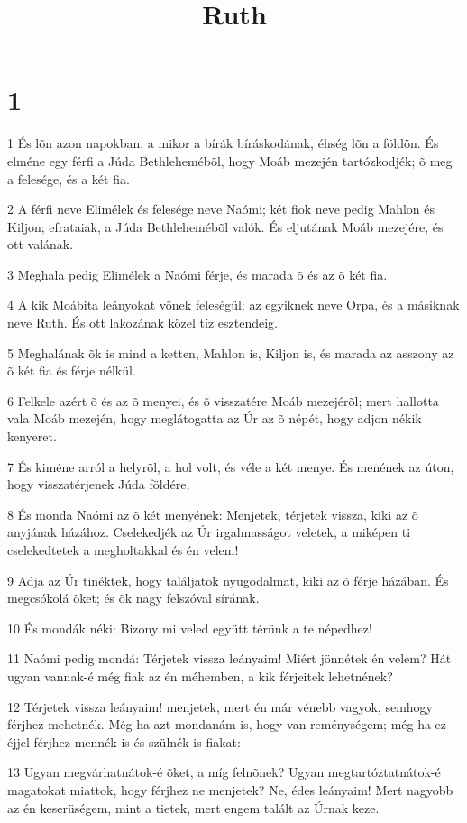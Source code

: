 

\title{Ruth}


\chapter{1}

\par 1 És lõn azon napokban, a mikor a bírák bíráskodának, éhség lõn a földön. És elméne egy férfi a Júda Bethlehemébõl, hogy Moáb mezején tartózkodjék; õ meg a felesége, és a két fia.
\par 2 A férfi neve Elimélek és felesége neve Naómi; két fiok neve pedig Mahlon és Kiljon; efrataiak, a Júda Bethlehemébõl valók. És eljutának Moáb mezejére, és ott valának.
\par 3 Meghala pedig Elimélek a Naómi férje, és marada õ és az õ két fia.
\par 4 A kik Moábita leányokat võnek feleségül; az egyiknek neve Orpa, és a másiknak neve Ruth. És ott lakozának közel tíz esztendeig.
\par 5 Meghalának õk is mind a ketten, Mahlon is, Kiljon is, és marada az asszony az õ két fia és férje nélkül.
\par 6 Felkele azért õ és az õ menyei, és õ visszatére Moáb mezejérõl; mert hallotta vala Moáb mezején, hogy meglátogatta az Úr az õ népét, hogy adjon nékik kenyeret.
\par 7 És kiméne arról a helyrõl, a hol volt, és véle a két menye. És menének az úton, hogy visszatérjenek Júda földére,
\par 8 És monda Naómi az õ két menyének: Menjetek, térjetek vissza, kiki az õ anyjának házához. Cselekedjék az Úr irgalmasságot veletek, a miképen ti cselekedtetek a megholtakkal és én velem!
\par 9 Adja az Úr tinéktek, hogy találjatok nyugodalmat, kiki az õ férje házában. És megcsókolá õket; és õk nagy felszóval sírának.
\par 10 És mondák néki: Bizony mi veled együtt térünk a te népedhez!
\par 11 Naómi pedig mondá: Térjetek vissza leányaim! Miért jönnétek én velem? Hát ugyan vannak-é még fiak az én méhemben, a kik férjeitek lehetnének?
\par 12 Térjetek vissza leányaim! menjetek, mert én már vénebb vagyok, semhogy férjhez mehetnék. Még ha azt mondanám is, hogy van reménységem; még ha ez éjjel férjhez mennék is és szülnék is fiakat:
\par 13 Ugyan megvárhatnátok-é õket, a míg felnõnek? Ugyan megtartóztatnátok-é magatokat miattok, hogy férjhez ne menjetek? Ne, édes leányaim! Mert nagyobb az én keserüségem, mint a tietek, mert engem talált az Úrnak keze.
